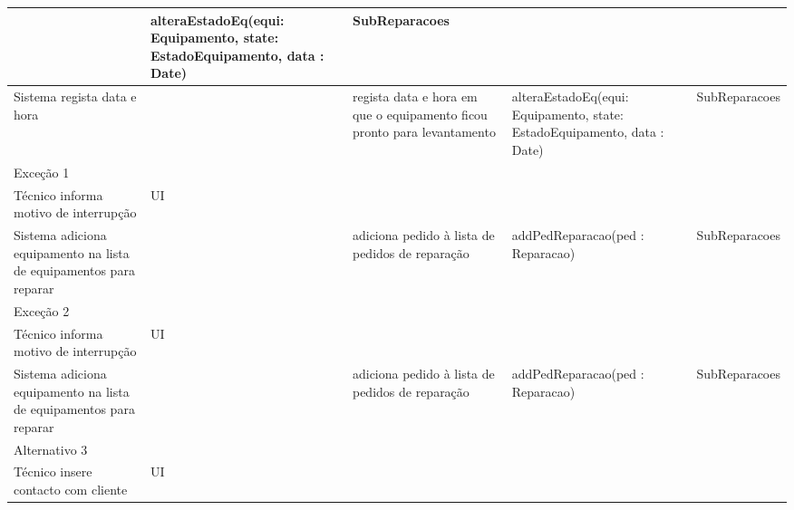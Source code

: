\documentclass[../relatorio.tex]{subfiles}
\begin{document}
\begin{landscape}
\begin{table}[!h]
\begin{tabular}{|p{5cm}|p{1cm}|p{4cm}|p{6cm}|p{3cm}|}
                     & alteraEstadoEq(equi: Equipamento, state: EstadoEquipamento, data : Date)
                     & SubReparacoes
            \\
            \hline
            Sistema regista data e hora
                     & 
                     & regista data e hora em que o equipamento ficou pronto para levantamento
                     & alteraEstadoEq(equi: Equipamento, state: EstadoEquipamento, data : Date)
                     & SubReparacoes
            \\
            \hline
            \rowcolor{red!30}
            Exceção 1 &                                                  &                  &     &            \\
            \hline
            \rowcolor{yellow}
            Técnico informa motivo de interrupção
                     & UI
                     & 
                     & 
                     & 
            \\
            \hline
            Sistema adiciona equipamento na lista de equipamentos para reparar
                     & 
                     & adiciona pedido à lista de pedidos de reparação 
                     & addPedReparacao(ped : Reparacao)
                     & SubReparacoes
            \\
            \hline
            \rowcolor{red!30}
            Exceção 2 &                                                  &                  &     &            \\
            \hline
            \rowcolor{yellow}
            Técnico informa motivo de interrupção
                     & UI
                     & 
                     & 
                     & 
            \\
            \hline
            Sistema adiciona equipamento na lista de equipamentos para reparar
                     & 
                     & adiciona pedido à lista de pedidos de reparação 
                     & addPedReparacao(ped : Reparacao) %
                     & SubReparacoes
            \\
            \hline
            \rowcolor{red!30}
            Alternativo 3 &                                                  &                  &     &            \\
            \hline
            \rowcolor{yellow}
            Técnico insere contacto com cliente
                     & UI
                     & 
                     & 
                     & 
            \\

\end{tabular}
\end{table}
\end{landscape}
\end{document}
